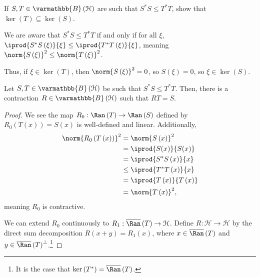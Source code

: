 \documentclass[10pt]{mypackage}
\renewcommand*{\mathbb}[1]{\varmathbb{#1}}
\newcommand{\B}{\mathbb{B}}
\begin{document}
\begin{exercise}
  If $S,T\in \B\left(\mathcal{H}\right)$ are such that $S^{\ast}S\leq T^{\ast}T$, show that $\ker\left(T\right) \subseteq \ker\left(S\right)$.
\end{exercise}
\begin{solution}
  We are aware that $S^{\ast}S\leq T^{\ast}T$ if and only if for all $\xi$, $ \iprod{S^{\ast}S\left(\xi\right)}{\xi} \leq \iprod{T^{\ast}T\left(\xi\right)}{\xi} $, meaning $\norm{S\left(\xi\right)}^2 \leq \norm{T\left(\xi\right)}^2$.\newline

  Thus, if $\xi \in \ker\left(T\right)$, then $\norm{S\left(\xi\right)}^2 = 0$, so $S\left(\xi\right) = 0$, so $\xi \in \ker\left(S\right)$.
\end{solution}
\begin{proposition}
  Let $S,T\in \B\left(\mathcal{H}\right)$ be such that $S^{\ast}S\leq T^{\ast}T$. Then, there is a contraction $R\in \B\left(\mathcal{H}\right)$ such that $RT = S$.
\end{proposition}
\begin{proof}
  We see the map $R_0: \Ran\left(T\right)\rightarrow \Ran\left(S\right)$ defined by $R_0\left(T\left(x\right)\right) = S\left(x\right)$ is well-defined and linear. Additionally,
  \begin{align*}
    \norm{R_0\left(T\left(x\right)\right)}^2 &= \norm{S\left(x\right)}^2\\
                                             &= \iprod{S(x)}{S(x)}\\
                                             &= \iprod{S^{\ast}S\left(x\right)}{x}\\
                                             &\leq \iprod{T^{\ast}T\left(x\right)}{x}\\
                                             &= \iprod{T\left(x\right)}{T\left(x\right)}\\
                                             &= \norm{T\left(x\right)}^2,
  \end{align*}
  meaning $R_0$ is contractive.\newline

  We can extend $R_0$ continuously to $R_1: \overline{\Ran}\left(T\right)\rightarrow \mathcal{H}$. Define $R: \mathcal{H}\rightarrow \mathcal{H}$ by the direct sum decomposition $R\left(x+y\right) = R_1\left(x\right)$, where $x\in \overline{\Ran}\left(T\right)$ and $y\in \overline{\Ran}\left(T\right)^{\perp}$.\footnote{It is the case that $\ker\left(T^{\ast}\right) = \overline{\Ran}\left(T\right)$.}
\end{proof}
\end{document}
